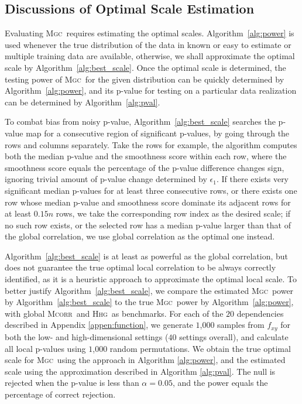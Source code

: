\documentclass[11pt]{article}
\providecommand{\sct}[1]{{\normalfont\textsc{#1}}}
\newcommand{\Mgc}{\sct{Mgc}}
\newcommand{\Hhg}{\sct{Hhg}}
\newcommand{\Mcorr}{\sct{Mcorr}}
\begin{document}
\clearpage
\subsection{Discussions of Optimal Scale Estimation}
\label{appen:diss}
Evaluating \Mgc~requires estimating the optimal scales. Algorithm~\ref{alg:power} is used whenever the true distribution of the data in known or easy to estimate or multiple training data are available, otherwise, we shall approximate the optimal scale by Algorithm~\ref{alg:best_scale}. Once the optimal scale is determined, the testing power of \Mgc~for the given distribution can be quickly determined by Algorithm~\ref{alg:power}, and its p-value for testing on a particular data realization can be determined by Algorithm~\ref{alg:pval}.

To combat bias from noisy p-value, Algorithm~\ref{alg:best_scale} searches the p-value map for a consecutive region of significant p-values, by going through the rows and columns separately. Take the rows for example, the algorithm computes both the median p-value and the smoothness score within each row, where the smoothness score equals the percentage of the p-value difference changes sign, ignoring trivial amount of p-value change determined by $\epsilon_{1}$. If there exists very significant median p-values for at least three consecutive rows, or there exists one row whose median p-value and smoothness score dominate its adjacent rows for at least $0.15n$ rows, we take the corresponding row index as the desired scale; if no such row exists, or the selected row has a median p-value larger than that of the global correlation, we use global correlation as the optimal one instead. 

Algorithm~\ref{alg:best_scale} is at least as powerful as the global correlation, but does not guarantee the true optimal local correlation to be always correctly identified, as it is a heuristic approach to approximate the optimal local scale. To better justify Algorithm~\ref{alg:best_scale}, we compare the estimated \Mgc~power by Algorithm~\ref{alg:best_scale} to the true \Mgc~power by Algorithm~\ref{alg:power}, with  global \Mcorr~and \Hhg~as benchmarks. For each of the $20$ dependencies described in Appendix \ref{appen:function}, we generate $1$,$000$ samples from $f_{xy}$ for both the low- and high-dimensional settings ($40$ settings overall), and calculate all local p-values using $1$,$000$ random permutations. 
We obtain the true optimal scale for \Mgc~using the approach in Algorithm \ref{alg:power}, and the estimated scale using the approximation described in Algorithm \ref{alg:pval}.  
The null is rejected when the p-value is less than $\alpha=0.05$, and the power equals the percentage of correct rejection. 
\end{document}
